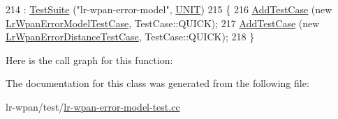 \begin{DoxyCode}
214   : \hyperlink{classns3_1_1TestSuite_a904b0c40583b744d30908aeb94636d1a}{TestSuite} (\textcolor{stringliteral}{"lr-wpan-error-model"}, \hyperlink{classns3_1_1TestSuite_a1ebfcab34ec8161e085e8e3a1855eae0a3885375a3787abf60431f8454b3cadbd}{UNIT})
215 \{
216   \hyperlink{classns3_1_1TestCase_a3718088e3eefd5d6454569d2e0ddd835}{AddTestCase} (\textcolor{keyword}{new} \hyperlink{classLrWpanErrorModelTestCase}{LrWpanErrorModelTestCase}, TestCase::QUICK);
217   \hyperlink{classns3_1_1TestCase_a3718088e3eefd5d6454569d2e0ddd835}{AddTestCase} (\textcolor{keyword}{new} \hyperlink{classLrWpanErrorDistanceTestCase}{LrWpanErrorDistanceTestCase}, TestCase::QUICK);
218 \}
\end{DoxyCode}


Here is the call graph for this function\+:




The documentation for this class was generated from the following file\+:\begin{DoxyCompactItemize}
\item 
lr-\/wpan/test/\hyperlink{lr-wpan-error-model-test_8cc}{lr-\/wpan-\/error-\/model-\/test.\+cc}\end{DoxyCompactItemize}
